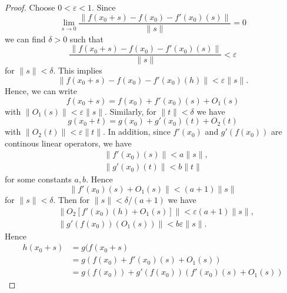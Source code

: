 \documentclass[12pt,reqno]{amsart}
\numberwithin{equation}{section}  %
\numberwithin{figure}{section}
\newcommand{\ee}{\varepsilon}
\theoremstyle{plain}
\theoremstyle{definition}
\theoremstyle{remark}
\begin{document}
  \begin{proof} Choose $0<\ee<1$. Since 
			\begin{equation*}
				\lim_{s \to 0} \frac{\|f (x_0 + s) - f(x_0) -
				f'(x_0)(s)\|}{\|s\|} = 0
			\end{equation*}
			we can find $\delta > 0$ such that 
			\begin{equation*}
				\frac{\|f (x_0 + s) - f(x_0) -
				f'(x_0)(s)\|}{\|s\|} < \ee
			\end{equation*}
			for $\|s\| < \delta$. This implies
			\begin{equation*}
				\|f(x_0 + s) - f(x_0) - f'(x_0)(h) \| < \ee \|s\|.
			\end{equation*}
			Hence, we can write
			\begin{equation*}
				f(x_0 + s) = f(x_0) + f'(x_0)(s) + O_1(s)
			\end{equation*}
			with $\|O_1(s)\| < \ee \|s\|$. Similarly, for $\|t\| <
			\delta$ we have 
			\begin{equation*}
				g(x_0 + t) = g(x_0) + g'(x_0)(t)+ O_2(t)
			\end{equation*}
			with $\|O_2(t)\| < \ee \|t\|$. In addition, since $f'(x_0)$
			and $g'(f(x_0))$ are continous linear operators, we have
			\begin{equation*}
				\begin{split}
					&\|f'(x_0)(s) \| < a \|s \|,
					\\
					&\|g'(x_0)(t) \| < b \|t \|
				\end{split}
			\end{equation*}
			for some constants $a , b$. Hence
			\begin{equation*}
				\|f'(x_0)(s) + O_1(s) \| < (a + 1) \|s\|
			\end{equation*}
			for $\|s\| < \delta$. Then for $\|s \| <
			\delta/(a+1)$ we have
			\begin{equation}
				\label{key_estimate}
				\begin{split}
					&\| O_2 [f'(x_0)(h) + O_1(s)] \| < \ee(a+1)\|s \|,
					\\
					& \|g'(f(x_0))(O_1(s))\| < b \ee \|s\|.
				\end{split}
			\end{equation}
			Hence
			\begin{equation*}
				\begin{split}
					h(x_0 + s) &= g(f(x_0 +s)
					\\
					&= g(f(x_0) + f'(x_0)(s) + O_1(s))
					\\
					&= g(f(x_0)) + g'(f(x_0))(f'(x_0)(s) + O_1(s)) 

\end{split}
\end{equation*}
\end{proof}
\end{document}
